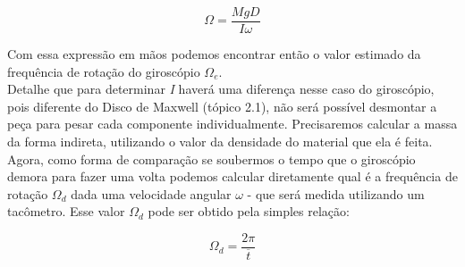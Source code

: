 \[ \Omega = \frac{MgD}{I \omega} \]

Com essa expressão em mãos podemos encontrar então o valor estimado da frequência de rotação do giroscópio $\Omega _e$.\\

Detalhe que para determinar \textit{I} haverá uma diferença nesse caso do giroscópio, pois diferente do Disco de Maxwell (tópico 2.1), não será possível desmontar a peça para pesar cada componente individualmente. Precisaremos calcular a massa da forma indireta, utilizando o valor da densidade do material que ela é feita.\\

Agora, como forma de comparação se soubermos o tempo que o giroscópio demora para fazer uma volta podemos calcular diretamente qual é a frequência de rotação $\Omega _d$ dada uma velocidade angular $\omega$ - que será medida utilizando um tacômetro. Esse valor $\Omega _d$ pode ser obtido pela simples relação:

\[ \Omega _d = \frac{2\pi}{\overline{t}} \]

